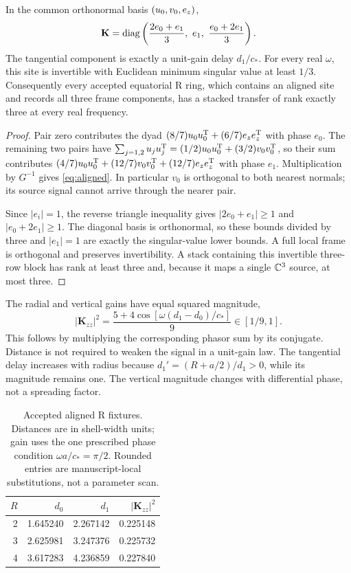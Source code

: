 \begin{theorem}\label{thm:aligned}
In the common orthonormal basis $(u_0,v_0,e_z)$,
\begin{equation}\label{eq:aligned}
\mathbf K=\diag\left(\frac{2e_0+e_1}{3},\ e_1,\ \frac{e_0+2e_1}{3}\right).
\end{equation}
The tangential component is exactly a unit-gain delay $d_1/c_*$. For every real $\omega$, this site is invertible with Euclidean minimum singular value at least $1/3$. Consequently every accepted equatorial R ring, which contains an aligned site and records all three frame components, has a stacked transfer of rank exactly three at every real frequency.
\end{theorem}
\begin{proof}
Pair zero contributes the dyad $(8/7)u_0u_0^{\mathrm T}+(6/7)e_ze_z^{\mathrm T}$ with phase $e_0$. The remaining two pairs have $\sum_{j=1,2}u_ju_j^{\mathrm T}=(1/2)u_0u_0^{\mathrm T}+(3/2)v_0v_0^{\mathrm T}$, so their sum contributes $(4/7)u_0u_0^{\mathrm T}+(12/7)v_0v_0^{\mathrm T}+(12/7)e_ze_z^{\mathrm T}$ with phase $e_1$. Multiplication by $G^{-1}$ gives \eqref{eq:aligned}. In particular $v_0$ is orthogonal to both nearest normals; its source signal cannot arrive through the nearer pair.

Since $|e_i|=1$, the reverse triangle inequality gives $|2e_0+e_1|\ge1$ and $|e_0+2e_1|\ge1$. The diagonal basis is orthonormal, so these bounds divided by three and $|e_1|=1$ are exactly the singular-value lower bounds. A full local frame is orthogonal and preserves invertibility. A stack containing this invertible three-row block has rank at least three and, because it maps a single $\mathbb C^3$ source, at most three.
\end{proof}

The radial and vertical gains have equal squared magnitude,
\begin{equation}\label{eq:gain}
|\mathbf K_{zz}|^2=\frac{5+4\cos[\omega(d_1-d_0)/c_*]}9\in[1/9,1].
\end{equation}
This follows by multiplying the corresponding phasor sum by its conjugate. Distance is not required to weaken the signal in a unit-gain law. The tangential delay increases with radius because $d_1'=(R+a/2)/d_1>0$, while its magnitude remains one. The vertical magnitude changes with differential phase, not a spreading factor.

\begin{table}[htbp]\centering
\caption{Accepted aligned R fixtures. Distances are in shell-width units; gain uses the one prescribed phase condition $\omega a/c_*=\pi/2$. Rounded entries are manuscript-local substitutions, not a parameter scan.}
\begin{tabular}{@{}rrrr@{}}\toprule
$R$ & $d_0$ & $d_1$ & $|\mathbf K_{zz}|^2$\\\midrule
2 & 1.645240 & 2.267142 & 0.225148\\
3 & 2.625981 & 3.247376 & 0.225732\\
4 & 3.617283 & 4.236859 & 0.227840\\\bottomrule
\end{tabular}\label{tab:radius}
\end{table}

